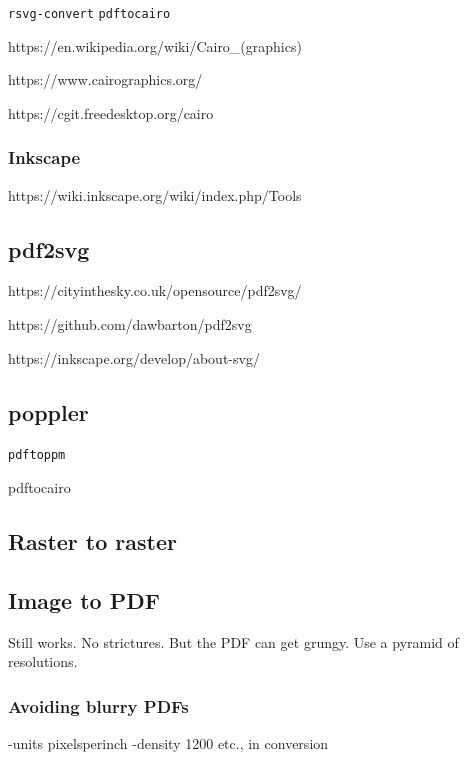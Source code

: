 \documentclass[
  11pt,
  british,
  a4paper,
]{article}
\begin{document}
\texttt{rsvg-convert} \texttt{pdftocairo}

https://en.wikipedia.org/wiki/Cairo\_(graphics)

https://www.cairographics.org/

https://cgit.freedesktop.org/cairo

\hypertarget{inkscape}{%
\subsubsection{Inkscape}\label{inkscape}}

https://wiki.inkscape.org/wiki/index.php/Tools

\hypertarget{pdf2svg}{%
\subsection{pdf2svg}\label{pdf2svg}}

https://cityinthesky.co.uk/opensource/pdf2svg/

https://github.com/dawbarton/pdf2svg

https://inkscape.org/develop/about-svg/

\hypertarget{poppler}{%
\subsection{poppler}\label{poppler}}

\texttt{pdftoppm}

pdftocairo

\hypertarget{raster-to-raster}{%
\subsection{Raster to raster}\label{raster-to-raster}}

\hypertarget{image-to-pdf}{%
\subsection{Image to PDF}\label{image-to-pdf}}

Still works. No strictures. But the PDF can get grungy. Use a pyramid of
resolutions.

\hypertarget{avoiding-blurry-pdfs}{%
\subsubsection{Avoiding blurry PDFs}\label{avoiding-blurry-pdfs}}

-units pixelsperinch -density 1200 etc., in conversion
\end{document}
